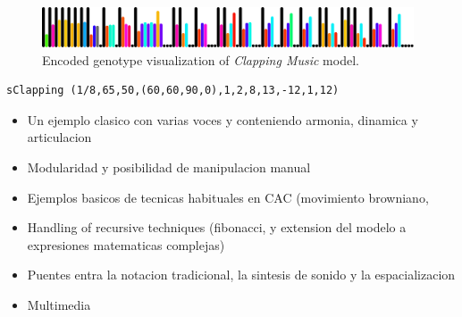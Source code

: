 \documentclass{article}
\begin{document}
\begin{figure}[H]
\begin{center}
  \includegraphics[width=11cm]{figs/clappingVisualized.pdf}
\end{center}  
  \caption{Encoded genotype visualization of \emph{Clapping Music} model.}
  \label{fig:boat3}
\end{figure}



{\small \begin{verbatim}sClapping (1/8,65,50,(60,60,90,0),1,2,8,13,-12,1,12)\end{verbatim}}  

 




{\color{red}


\begin{itemize}



\item Un ejemplo clasico con varias voces y conteniendo armonia, dinamica y articulacion
\item Modularidad y posibilidad de manipulacion manual
\item Ejemplos basicos de tecnicas habituales en CAC (movimiento browniano,
\item Handling of recursive techniques (fibonacci, y extension del modelo a expresiones matematicas complejas)
\item Puentes entra la notacion tradicional, la sintesis de sonido y la espacializacion
\item Multimedia
\end{itemize}

}
\end{document}
